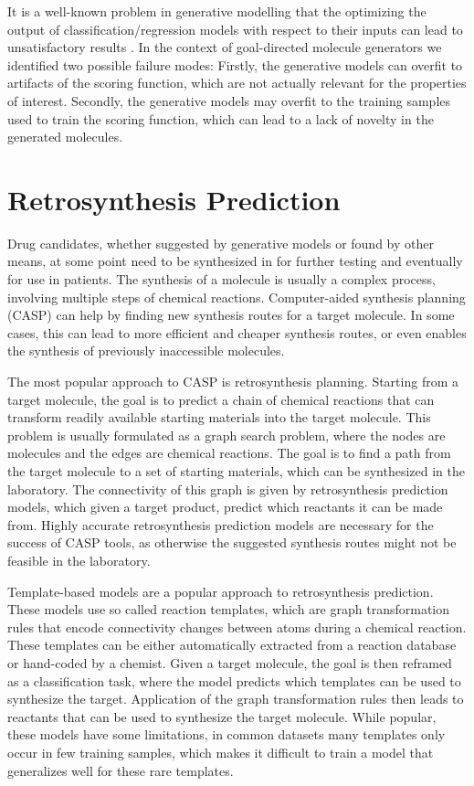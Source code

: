 It is a well-known problem in generative modelling that the optimizing the
output of classification/regression models with respect to their inputs can lead
to unsatisfactory results \citep{todo}. In the context of goal-directed molecule
generators we identified two possible failure modes: Firstly, the generative
models can overfit to artifacts of the scoring function, which are not actually
relevant for the properties of interest. Secondly, the generative models may
overfit to the training samples used to train the scoring function, which can
lead to a lack of novelty in the generated molecules.

\section{Retrosynthesis Prediction\label{sec:retrosynthesis}}
Drug candidates, whether suggested by generative models or found by other means,
at some point need to be synthesized in for further testing and 
eventually for use in patients. The synthesis of a molecule is usually a complex
process, involving multiple steps of chemical reactions. Computer-aided synthesis 
planning (CASP) can help by finding new synthesis routes for a target molecule.
In some cases, this can lead to more efficient and cheaper synthesis routes, or
even enables the synthesis of previously inaccessible molecules.

The most popular approach to CASP is retrosynthesis planning. Starting from a
target molecule, the goal is to predict a chain of chemical reactions that can
transform readily available starting materials into the target molecule. This
problem is usually formulated as a graph search problem, where the nodes are
molecules and the edges are chemical reactions. The goal is to find a path from
the target molecule to a set of starting materials, which can be synthesized in
the laboratory. The connectivity of this graph is given by retrosynthesis
prediction models, which given a target product, predict which reactants it can
be made from. Highly accurate retrosynthesis prediction models are necessary for
the success of CASP tools, as otherwise the suggested synthesis routes might not
be feasible in the laboratory.

Template-based models are a popular approach to retrosynthesis prediction. These
models use so called reaction templates, which are graph transformation rules 
that encode connectivity changes between atoms during a chemical reaction. These 
templates can be either automatically extracted from a reaction database or
hand-coded by a chemist. Given a target molecule, the goal is then reframed as a
classification task, where the model predicts which templates can be used to
synthesize the target. Application of the graph transformation rules then leads
to reactants that can be used to synthesize the target molecule. While popular, 
these models have some limitations, in common datasets many templates only occur 
in few training samples, which makes it difficult to train a model that generalizes
well for these rare templates.

